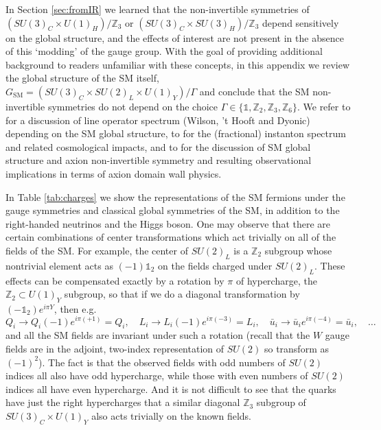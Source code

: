 \documentclass[11pt,a4paper]{article}
\newcommand{\sutt}{\left(SU(3)_C \times SU(3)_H\right)/\mathbb{Z}_3}
\newcommand{\suto}{\left(SU(3)_C \times U(1)_H\right)/\mathbb{Z}_3}
\begin{document}
In Section \ref{sec:fromIR} we learned that the non-invertible symmetries of $\suto$ or $\sutt$ depend sensitively on the global structure, and the effects of interest are not present in the absence of this `modding' of the gauge group. 
With the goal of providing additional background to readers unfamiliar with these concepts, in this appendix we review the global structure of the SM itself, $G_{\text{SM}} = (SU(3)_C \times SU(2)_L \times U(1)_Y) / \Gamma$ and conclude that the SM non-invertible symmetries do not depend on the choice $\Gamma \in \lbrace \mathds{1}, \mathbb{Z}_2, \mathbb{Z}_3, \mathbb{Z}_6\rbrace$. 
We refer to  \cite{Tong:2017oea} for a discussion of line operator spectrum (Wilson, 't Hooft and Dyonic) depending on the SM global structure, to \cite{Anber:2021upc} for the (fractional) instanton spectrum and related cosmological impacts, and to \cite{Cordova:2023her} for the discussion of SM global structure and axion non-invertible symmetry and resulting observational implications in terms of axion domain wall physics. 

In Table \ref{tab:charges} we show the representations of the SM fermions under the gauge symmetries and classical global symmetries of the SM, in addition to the right-handed neutrinos and the Higgs boson. One may observe that there are certain combinations of center transformations which act trivially on all of the fields of the SM. For example, the center of $SU(2)_L$ is a $\mathbb{Z}_2$ subgroup whose nontrivial element acts as $(-1)\mathds{1}_2$ on the fields charged under $SU(2)_L$. These effects can be compensated exactly by a rotation by $\pi$ of hypercharge, the $\mathbb{Z}_2 \subset U(1)_Y$ subgroup, so that if we do a diagonal transformation by $(-\mathds{1}_2) e^{i \pi Y}$, then e.g. 
\begin{equation}
    Q_i \rightarrow Q_i (-1) e^{i \pi (+1)} = Q_i, \quad L_i \rightarrow L_i (-1) e^{i \pi (-3)} = L_i, \quad \bar u_i \rightarrow \bar u_i e^{i \pi (-4)} = \bar u_i, \quad \dots
\end{equation}
and all the SM fields are invariant under such a rotation (recall that the $W$ gauge fields are in the adjoint, two-index representation of $SU(2)$ so transform as $(-1)^2$). The fact is that the observed fields with odd numbers of $SU(2)$ indices all also have odd hypercharge, while those with even numbers of $SU(2)$ indices all have even hypercharge. And it is not difficult to see that the quarks have just the right hypercharges that a similar diagonal $\mathbb{Z}_3$ subgroup of $SU(3)_C \times U(1)_Y$ also acts trivially on the known fields.
\end{document}
